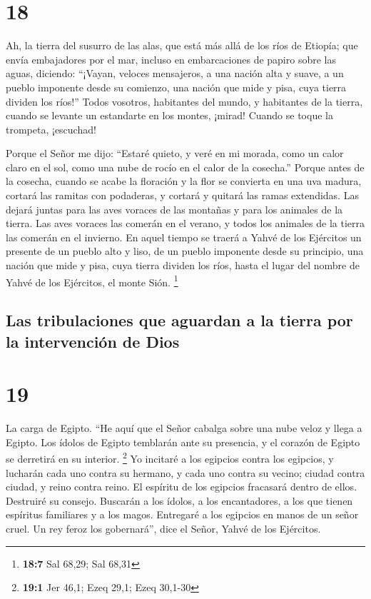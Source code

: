 \hypertarget{section-17}{%
\section{18}\label{section-17}}

 Ah, la tierra del susurro de las alas, que está más allá
de los ríos de Etiopía;  que envía embajadores por el mar,
incluso en embarcaciones de papiro sobre las aguas, diciendo: ``¡Vayan,
veloces mensajeros, a una nación alta y suave, a un pueblo imponente
desde su comienzo, una nación que mide y pisa, cuya tierra dividen los
ríos!''  Todos vosotros, habitantes del mundo, y
habitantes de la tierra, cuando se levante un estandarte en los montes,
¡mirad! Cuando se toque la trompeta, ¡escuchad!

 Porque el Señor me dijo: ``Estaré quieto, y veré en mi
morada, como un calor claro en el sol, como una nube de rocío en el
calor de la cosecha.''  Porque antes de la cosecha, cuando
se acabe la floración y la flor se convierta en una uva madura, cortará
las ramitas con podaderas, y cortará y quitará las ramas extendidas.
 Las dejará juntas para las aves voraces de las montañas y
para los animales de la tierra. Las aves voraces las comerán en el
verano, y todos los animales de la tierra las comerán en el invierno.
 En aquel tiempo se traerá a Yahvé de los Ejércitos un
presente de un pueblo alto y liso, de un pueblo imponente desde su
principio, una nación que mide y pisa, cuya tierra dividen los ríos,
hasta el lugar del nombre de Yahvé de los Ejércitos, el monte Sión.
\footnote{\textbf{18:7} Sal 68,29; Sal 68,31}

\hypertarget{las-tribulaciones-que-aguardan-a-la-tierra-por-la-intervenciuxf3n-de-dios}{%
\subsection{Las tribulaciones que aguardan a la tierra por la
intervención de
Dios}\label{las-tribulaciones-que-aguardan-a-la-tierra-por-la-intervenciuxf3n-de-dios}}

\hypertarget{section-18}{%
\section{19}\label{section-18}}

 La carga de Egipto. ``He aquí que el Señor cabalga sobre
una nube veloz y llega a Egipto. Los ídolos de Egipto temblarán ante su
presencia, y el corazón de Egipto se derretirá en su interior.
\footnote{\textbf{19:1} Jer 46,1; Ezeq 29,1; Ezeq 30,1-30}
 Yo incitaré a los egipcios contra los egipcios, y
lucharán cada uno contra su hermano, y cada uno contra su vecino; ciudad
contra ciudad, y reino contra reino.  El espíritu de los
egipcios fracasará dentro de ellos. Destruiré su consejo. Buscarán a los
ídolos, a los encantadores, a los que tienen espíritus familiares y a
los magos.  Entregaré a los egipcios en manos de un señor
cruel. Un rey feroz los gobernará'', dice el Señor, Yahvé de los
Ejércitos.

